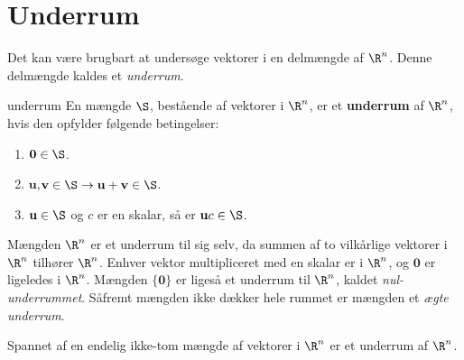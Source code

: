 \section{Underrum}
Det kan være brugbart at undersøge vektorer i en delmængde af $\R^n$.
Denne delmængde kaldes et \textit{underrum}.
%
\begin{defn}{}{underrum}
En mængde $\S$, bestående af vektorer i $\R^n$, er et \textbf{underrum} af $\R^n$, hvis den opfylder følgende betingelser:	
\begin{enumerate}[label=(\alph*)]
\item $\textbf{0}\in \S$.
\item $\textbf{u}$,$\textbf{v} \in \S \rightarrow \textbf{u}+\textbf{v} \in \S $.
\item $\textbf{u} \in \S$ og $c$ er en skalar, så er $\textbf{u}c \in \S$.
\end{enumerate}
\end{defn}
\noindent
Mængden $\R^n$ er et underrum til sig selv, da summen af to vilkårlige vektorer i $\R^n$ tilhører $\R^n$.
Enhver vektor multipliceret med en skalar er i $\R^n$, og $\textbf{0}$ er ligeledes i $\R^n$. 
Mængden $\{\textbf{0}\}$ er ligeså et underrum til $\R^n$, kaldet \textit{nul-underrummet}.
Såfremt mængden ikke dækker hele rummet er mængden et \textit{ægte underrum}.
%
%
\begin{thm}{}{}
Spannet af en endelig ikke-tom mængde af vektorer i $\R^n$ er et underrum af $\R^n$.
\end{thm}
%
